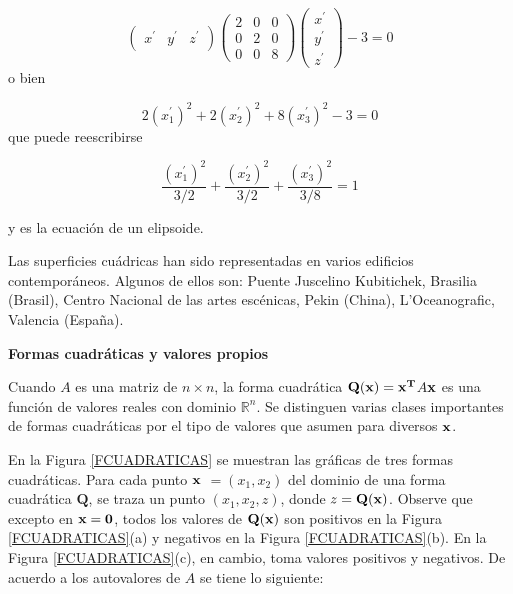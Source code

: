 \begin{example}
  \begin{equation}
\left(\begin{array}{ccc} x^\prime & y^\prime & z^\prime
\end{array}
 \right) \left(\begin{array}{ccc} 2 & 0 & 0  \\0 & 2 & 0 \\0  & 0 & 8
\end{array}
 \right)  \left(\begin{array}{c} x^\prime \\y^\prime  \\z^\prime
\end{array}
 \right) -3=0\label{fcuadraticatodaR3ej
 }
\end{equation}
\noindent
o bien 
  
\begin{equation}
2(x_1^\prime)^{2}+2(x_2^\prime)^{2}+8(x_3^\prime)^{2}-3 = 0 \label{ejemplocuadricau}
\end{equation}
\noindent
que puede reescribirse

\begin{equation}
\frac {(x_1^\prime)^{2}}{3/2}+\frac {(x_2^\prime)^{2}}{3/2}+\frac {(x_3^\prime)^{2}}{3/8} = 1 \label{ejemplocuadricauu}
\end{equation}

\bigskip

y es la ecuación de un elipsoide.
\end{example}


\begin{remark}
Las superficies cuádricas han sido representadas en varios edificios contemporáneos.
Algunos de ellos son: Puente Juscelino Kubitichek, Brasilia (Brasil), Centro Nacional de las artes escénicas, Pekin (China), 
L'Oceanografic, Valencia (España).
\end{remark}

\textbf{ Formas cuadráticas y valores propios}  

 
Cuando $A$ es una matriz  de $n \times n$, la forma cuadrática $\mathbf{Q}(\bf x) = \bf{x}^T$$ A$$ \bf{x}$ es una función de
valores reales con dominio $\mathbb{R}^n$. Se distinguen varias clases importantes de formas cuadráticas
por el tipo de valores que asumen para diversos $\bf x$.


En la Figura  \ref{FCUADRATICAS} se muestran las gráficas de tres formas cuadráticas. Para cada punto
$\bf{x}$ $ = (x_1, x_2)$ del dominio de una forma cuadrática $\mathbf{Q}$, se traza un punto $(x_1, x_2, z)$, donde
$z = \mathbf{Q}(\bf x)$. Observe que excepto en $\bf x= \bf 0$, todos los valores de $\mathbf{Q}(\bf x)$ son positivos en la Figura \ref{FCUADRATICAS}(a) y  negativos en la Figura \ref{FCUADRATICAS}(b). En la Figura \ref{FCUADRATICAS}(c), en cambio, toma valores positivos y negativos.
De acuerdo a los autovalores de $A$ se tiene lo siguiente:


